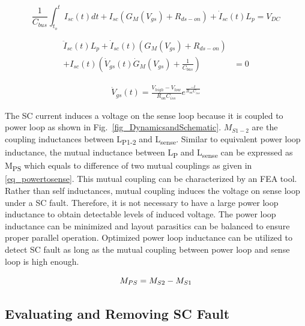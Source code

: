 \documentclass[journal]{IEEEtran}
\begin{document}
\begin{equation}
\label{eq_simpleform}
    \frac{1}{C_{bus}}\int_{t_o}^t I_{sc}(t)dt + I_{sc} (G_M(V_{gs}) + R_{ds-on}) + \dot{I}_{sc}(t) L_p = V_{DC}
\end{equation}

\begin{equation}
\label{eq_pathdynamics}
\begin{split}
    \ddot{I}_{sc}(t) L_p + \dot{I}_{sc}(t) (G_M(V_{gs}) + R_{ds-on})
    \\
    + I_{sc}(t) (\dot{V}_{gs}(t) \dot{G}_{M}(V_{gs}) + \frac{1}{C_{bus}}) & = 0
\end{split}
\end{equation}

\begin{equation}
\label{eq_vgsdot}
\begin{split}
 \dot{V}_{gs}(t) = \frac{V_{high} - V_{low}}{R_{on} C_{iss}}e^{\frac{-t}{R_{on} C_{iss}}}
\end{split}
\end{equation}


The SC current induces a voltage on the sense loop because it is coupled to power loop as shown in Fig.~\ref{fig_DynamicsandSchematic}. $M_{S1-2}$ are the coupling inductances between L\textsubscript{P1-2} and L\textsubscript{sense}. Similar to equivalent power loop inductance, the mutual inductance between L\textsubscript{P} and L\textsubscript{sense} can be expressed as M\textsubscript{PS} which equals to difference of two mutual couplings as given in \eqref{eq_powertosense}. This mutual coupling can be characterized by an FEA tool. Rather than self inductances, mutual coupling induces the voltage on sense loop under a SC fault. Therefore, it is not necessary to have a large power loop inductance to obtain detectable levels of induced voltage. The power loop inductance can be minimized and layout parasitics can be balanced to ensure proper parallel operation. Optimized power loop inductance can be utilized to detect SC fault as long as the mutual coupling between power loop and sense loop is high enough.

\begin{equation}
    \label{eq_powertosense}
    \centering
     M_{PS} = M_{S2} - M_{S1}
\end{equation}

\subsection{Evaluating and Removing SC Fault}
\end{document}
